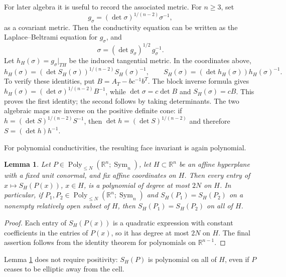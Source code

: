 \documentclass[10pt,a4paper]{amsart}
\newtheorem{lemma}[theorem]{Lemma}
\newcommand{\R}{\mathbb R}
\newcommand{\Sym}{\operatorname{Sym}}
\begin{document}
For later algebra it is useful to record the associated metric.  For
\(n\ge3\), set
\begin{equation}
  g_\sigma=(\det \sigma)^{1/(n-2)}\sigma^{-1},
  \label{eq:metric-from-conductivity}
\end{equation}
as a covariant metric.  Then the conductivity equation can be written as the
Laplace--Beltrami equation for \(g_\sigma\), and
\begin{equation}
  \sigma=(\det g_\sigma)^{1/2}\,g_\sigma^{-1}.
  \label{eq:conductivity-from-metric}
\end{equation}
Let \(h_H(\sigma)=g_\sigma|_{TH}\) be the induced tangential metric.  In the
coordinates above,
\begin{equation}
  h_H(\sigma)=(\det S_H(\sigma))^{1/(n-2)}S_H(\sigma)^{-1},
  \qquad
  S_H(\sigma)=(\det h_H(\sigma))h_H(\sigma)^{-1}.
  \label{eq:metric-schur-relation}
\end{equation}
To verify these identities, put \(B=A_T-bc^{-1}b^T\).  The block inverse
formula gives \(h_H(\sigma)=(\det\sigma)^{1/(n-2)}B^{-1}\), while
\(\det\sigma=c\det B\) and \(S_H(\sigma)=cB\).  This proves the first identity;
  the second follows by taking determinants.  The two algebraic maps are inverse on the
positive definite cone: if
\(h=(\det S)^{1/(n-2)}S^{-1}\), then
\(\det h=(\det S)^{1/(n-2)}\) and therefore \(S=(\det h)h^{-1}\).

For polynomial conductivities, the resulting face invariant is again
polynomial.

\begin{lemma}
\label{lem:schur-polynomial}
Let \(P\in\operatorname{Poly}_{\le N}(\R^n;\Sym_n)\), let \(H\subset\R^n\) be
an affine hyperplane with a fixed unit conormal, and fix affine coordinates on
\(H\).  Then every entry of \(x\mapsto S_H(P(x))\), \(x\in H\), is a
polynomial of degree at most \(2N\) on \(H\).  In particular, if
\(P_1,P_2\in\operatorname{Poly}_{\le N}(\R^n;\Sym_n)\) and
\(S_H(P_1)=S_H(P_2)\) on a nonempty relatively open subset of \(H\), then
\(S_H(P_1)=S_H(P_2)\) on all of \(H\).
\end{lemma}

\begin{proof}
Each entry of \(S_H(P(x))\) is a quadratic expression with constant
coefficients in the entries of \(P(x)\), so it has degree at most \(2N\) on
\(H\).  The final assertion follows from the identity theorem for polynomials
on \(\R^{n-1}\).
\end{proof}

Lemma \ref{lem:schur-polynomial} does not require positivity: \(S_H(P)\) is
polynomial on all of \(H\), even if \(P\) ceases to be elliptic away from the
cell.
\end{document}
